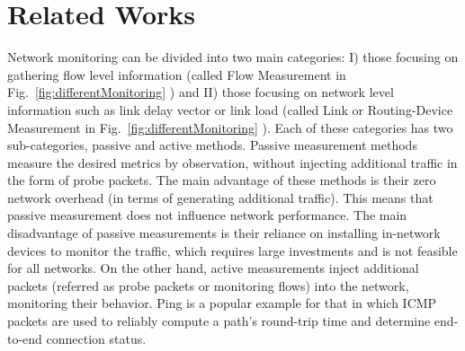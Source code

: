 \documentclass[10pt, journal, letterpaper]{IEEEtran}
\begin{document}

\section{Related Works}
Network monitoring can be divided into two main categories: I) those focusing on gathering flow level information (called Flow Measurement in Fig.~\ref{fig:differentMonitoring} \cite{roy2018cloud, guo2015pingmesh, gamage2019one,hernandez2007one,guingo2012distributed,bovy2002analysis,di2010new,van2014opennetmon}) and II) those focusing on network level information such as link delay vector or link load (called Link or Routing-Device Measurement in Fig.~\ref{fig:differentMonitoring} \cite{nakanishi2018route,naka2017route,gao2016accurate,tsang2003network,lawrence2006network,duffield2001network,gao2014domo}). Each of these categories has two sub-categories, passive and active methods. Passive measurement methods measure the desired metrics by observation, without injecting additional traffic in the form of probe packets. The main advantage of these methods is their zero network overhead (in terms of generating additional traffic). This means that passive measurement does not influence network performance. The main disadvantage of passive measurements is their reliance on installing in-network devices to monitor the traffic, which requires large investments and is not feasible for all networks. On the other hand, active measurements inject additional packets (referred as probe packets or monitoring flows) into the network, monitoring their behavior. Ping is a popular example for that in which ICMP packets are used to reliably compute a path’s round-trip time and determine end-to-end connection status.
\end{document}
